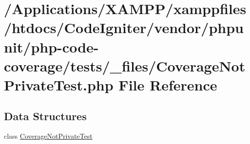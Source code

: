 \hypertarget{php-code-coverage_2tests_2__files_2_coverage_not_private_test_8php}{}\section{/\+Applications/\+X\+A\+M\+P\+P/xamppfiles/htdocs/\+Code\+Igniter/vendor/phpunit/php-\/code-\/coverage/tests/\+\_\+files/\+Coverage\+Not\+Private\+Test.php File Reference}
\label{php-code-coverage_2tests_2__files_2_coverage_not_private_test_8php}
\subsection*{Data Structures}
\begin{DoxyCompactItemize}
\item 
class \mbox{\hyperlink{class_coverage_not_private_test}{Coverage\+Not\+Private\+Test}}
\end{DoxyCompactItemize}
